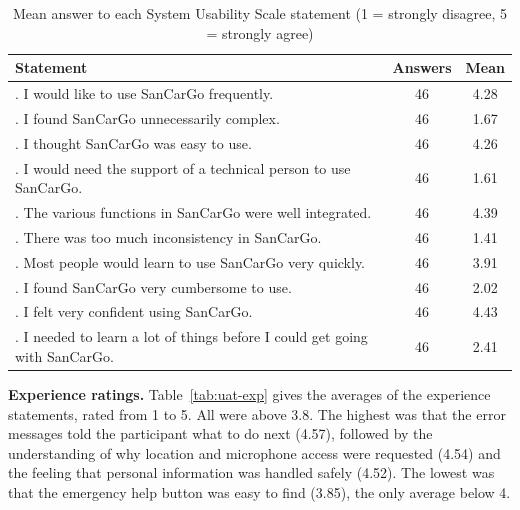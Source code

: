 \begin{table}[htbp]
    \centering
    \caption{Mean answer to each System Usability Scale statement (1 = strongly disagree, 5 = strongly agree)}\label{tab:uat-sus}
    \small
    \renewcommand{\arraystretch}{1.15}
    \begin{tabular}{|>{\raggedright\arraybackslash}p{}|c|c|}
        \hline
        \textbf{Statement} & \textbf{Answers} & \textbf{Mean} \\
        \hline
        1. I would like to use SanCarGo frequently. & 46 & 4.28 \\
        \hline
        2. I found SanCarGo unnecessarily complex. & 46 & 1.67 \\
        \hline
        3. I thought SanCarGo was easy to use. & 46 & 4.26 \\
        \hline
        4. I would need the support of a technical person to use SanCarGo. & 46 & 1.61 \\
        \hline
        5. The various functions in SanCarGo were well integrated. & 46 & 4.39 \\
        \hline
        6. There was too much inconsistency in SanCarGo. & 46 & 1.41 \\
        \hline
        7. Most people would learn to use SanCarGo very quickly. & 46 & 3.91 \\
        \hline
        8. I found SanCarGo very cumbersome to use. & 46 & 2.02 \\
        \hline
        9. I felt very confident using SanCarGo. & 46 & 4.43 \\
        \hline
        10. I needed to learn a lot of things before I could get going with SanCarGo. & 46 & 2.41 \\
        \hline
    \end{tabular}
\end{table}

\textbf{Experience ratings.} Table~\ref{tab:uat-exp} gives the averages of the experience statements, rated from 1 to 5. All were above 3.8. The highest was that the error messages told the participant what to do next (4.57), followed by the understanding of why location and microphone access were requested (4.54) and the feeling that personal information was handled safely (4.52). The lowest was that the emergency help button was easy to find (3.85), the only average below 4.

